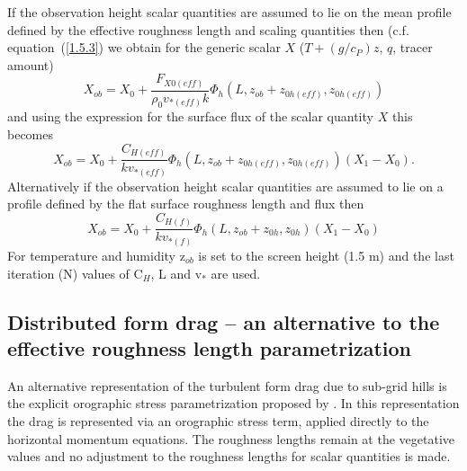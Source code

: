 \documentclass{UMDP_article}
\begin{document}
If the observation height scalar quantities are assumed to lie on the
mean profile defined by the effective roughness length and scaling
quantities then (c.f. equation~(\ref{1.5.3}) we obtain for the generic
scalar $X$ ($T+(g/c_{P})z$, $q$, tracer amount)
\begin{equation}
  X_{ob} =  X_0 + \frac{ F_{X0(eff)} }{ \rho _0  v_{\ast (eff)} k}  \Phi _h (L,  z_{ob} +  z_{0h(eff)} ,  z_{0h(eff)} )
  \label{2.3.5}
\end{equation}
and using the expression for the surface flux of the scalar quantity
$X$ this becomes
\begin{equation}
  X_{ob} =  X_0 + \frac{ C_{H(eff)} }{k v_{\ast (eff)} }  \Phi _h (L,  z_{ob} +  z_{0h(eff)} ,  z_{0h(eff)} ) ( X_1 -  X_0 ).
  \label{2.3.6}
\end{equation}
Alternatively if the observation height scalar quantities are assumed
to lie on a profile defined by the flat surface roughness length and
flux then
\begin{equation}
  X_{ob} =  X_0 + \frac{ C_{H(f)} }{k v_{\ast (f)} }  \Phi _h (L,  z_{ob} +  z_{0h} ,  z_{0h} ) ( X_1 -  X_0 )
  \label{2.3.7}
\end{equation}
For temperature and humidity z$_{ob}$ is set to the screen height (1.5
m) and the last iteration (N) values of C$_{H}$, L and v$_{\ast }$ are
used.

\subsection{Distributed form drag -- an alternative to the effective
  roughness length parametrization}\label{section_2.4}
An alternative representation of the turbulent form drag due to
sub-grid hills is the explicit orographic stress parametrization
proposed by \cite{wood01:_param}.  In this representation the drag is
represented via an orographic stress term, applied directly to the
horizontal momentum equations. The roughness lengths remain at the
vegetative values and no adjustment to the roughness lengths for
scalar quantities is made.
\end{document}
